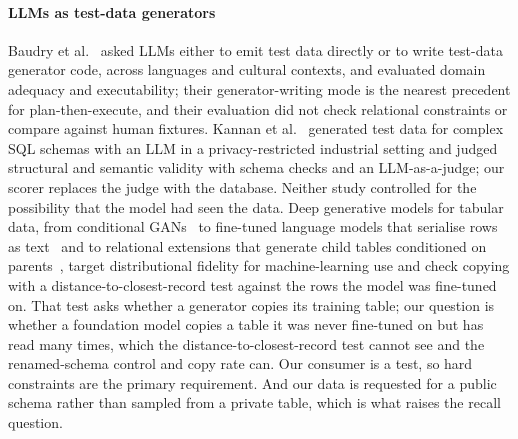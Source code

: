 \documentclass[preprint,12pt]{elsarticle}
\begin{document}
\paragraph{LLMs as test-data generators} Baudry et al.~\cite{baudry2024generators} asked LLMs either to emit test data directly or to write test-data generator code, across languages and cultural contexts, and evaluated domain adequacy and executability; their generator-writing mode is the nearest precedent for plan-then-execute, and their evaluation did not check relational constraints or compare against human fixtures. Kannan et al.~\cite{kannan2025sqltestdata} generated test data for complex SQL schemas with an LLM in a privacy-restricted industrial setting and judged structural and semantic validity with schema checks and an LLM-as-a-judge; our scorer replaces the judge with the database. Neither study controlled for the possibility that the model had seen the data. Deep generative models for tabular data, from conditional GANs~\cite{xu2019ctgan} to fine-tuned language models that serialise rows as text~\cite{borisov2023great} and to relational extensions that generate child tables conditioned on parents~\cite{solatorio2023realtabformer}, target distributional fidelity for machine-learning use and check copying with a distance-to-closest-record test against the rows the model was fine-tuned on. That test asks whether a generator copies its training table; our question is whether a foundation model copies a table it was never fine-tuned on but has read many times, which the distance-to-closest-record test cannot see and the renamed-schema control and copy rate can. Our consumer is a test, so hard constraints are the primary requirement. And our data is requested for a public schema rather than sampled from a private table, which is what raises the recall question.
\end{document}
